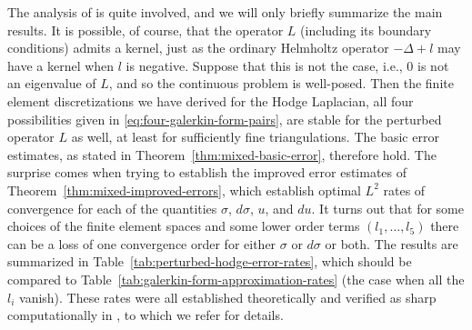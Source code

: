 {The analysis of  is quite involved, and we will only briefly summarize the main results. It is possible, of course, that the operator $L$ (including its boundary conditions) admits a kernel, just as the ordinary Helmholtz operator $-\Delta+l$ may have a kernel when $l$ is negative. Suppose that this is not the case, i.e., $0$ is not an eigenvalue of $L$, and so the continuous problem is well-posed. Then the finite element discretizations we have derived for the Hodge Laplacian, all four possibilities given in \eqref{eq:four-galerkin-form-pairs}, are stable for the perturbed operator $L$ as well, at least for sufficiently fine triangulations. The basic error estimates, as stated in Theorem~\ref{thm:mixed-basic-error}, therefore hold. The surprise comes when trying to establish the improved error estimates of Theorem~\ref{thm:mixed-improved-errors}, which establish optimal $L^2$ rates of convergence for each of the quantities $\sigma$, $d\sigma$, $u$, and $du$. It turns out that for some choices of the finite element spaces and some lower order terms $(l_1,\ldots,l_5)$ there can be a loss of one convergence order for either $\sigma$ or $d\sigma$ or both. The results are summarized in Table~\ref{tab:perturbed-hodge-error-rates}, which should be compared to Table~\ref{tab:galerkin-form-approximation-rates} (the case when all the $l_i$ vanish). These rates were all established theoretically and verified as sharp computationally in , to which we refer for details.}

